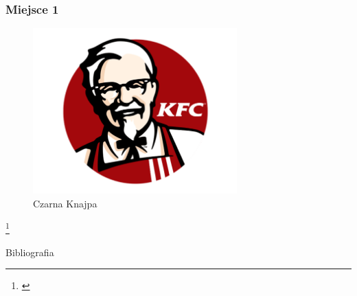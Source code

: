 \documentclass{beamer}
\begin{document}
\begin{frame}
\frametitle{Miejsce 1}
    \begin{figure}
        \includegraphics[width=0.7\textwidth]{kfc.png}
        \caption{Czarna Knajpa}
    \end{figure}
    \footnote{\cite{knajpa5}}
\end{frame}

\begin{frame}[allowframebreaks]{Bibliografia}
    
    
\end{frame}
\end{document}
